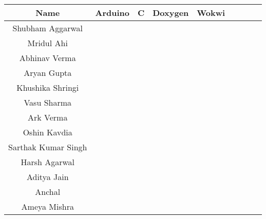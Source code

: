 \begin{center}
\label{table:competency_apd}
\begin{longtable}{|c|c|c|c|c|c|p{1.2cm}|c|c|}
\hline
Name                & Arduino                  & C                        & Doxygen                  & Wokwi                    \\ \hline
Shubham Aggarwal    & \cellcolor[HTML]{92D050} & \cellcolor[HTML]{00B050} & \cellcolor[HTML]{FFC000} & \cellcolor[HTML]{FFFF00} \\ \hline
Mridul Ahi          & \cellcolor[HTML]{92D050} & \cellcolor[HTML]{00B050} & \cellcolor[HTML]{F2F2F2} & \cellcolor[HTML]{F2F2F2} \\ \hline
Abhinav Verma       & \cellcolor[HTML]{92D050} & \cellcolor[HTML]{00B050} & \cellcolor[HTML]{FFC000} & \cellcolor[HTML]{FFC000} \\ \hline
Aryan Gupta         & \cellcolor[HTML]{FFFF00} & \cellcolor[HTML]{FFFF00} & \cellcolor[HTML]{F2F2F2} & \cellcolor[HTML]{F2F2F2} \\ \hline
Khushika Shringi    & \cellcolor[HTML]{92D050} & \cellcolor[HTML]{92D050} & \cellcolor[HTML]{F2F2F2} & \cellcolor[HTML]{FFC000} \\ \hline
Vasu Sharma         & \cellcolor[HTML]{FFFF00} & \cellcolor[HTML]{00B050} & \cellcolor[HTML]{F2F2F2} & \cellcolor[HTML]{FFC000} \\ \hline
Ark Verma           & \cellcolor[HTML]{FFFF00} & \cellcolor[HTML]{00B050} & \cellcolor[HTML]{F2F2F2} & \cellcolor[HTML]{F2F2F2} \\ \hline
Oshin Kavdia        & \cellcolor[HTML]{FFFF00} & \cellcolor[HTML]{00B050} & \cellcolor[HTML]{F2F2F2} & \cellcolor[HTML]{F2F2F2} \\ \hline
Sarthak Kumar Singh & \cellcolor[HTML]{FFFF00} & \cellcolor[HTML]{00B050} & \cellcolor[HTML]{F2F2F2} & \cellcolor[HTML]{F2F2F2} \\ \hline
Harsh Agarwal       & \cellcolor[HTML]{92D050} & \cellcolor[HTML]{92D050} & \cellcolor[HTML]{FFC000} & \cellcolor[HTML]{F2F2F2} \\ \hline
Aditya Jain       & \cellcolor[HTML]{92D050} & \cellcolor[HTML]{92D050} & \cellcolor[HTML]{FFC000} & \cellcolor[HTML]{FFFF00} \\ \hline
Anchal       & \cellcolor[HTML]{92D050} & \cellcolor[HTML]{92D050} & \cellcolor[HTML]{FFFF00} & \cellcolor[HTML]{FFFF00} \\ \hline
Ameya Mishra      & \cellcolor[HTML]{FFFF00} & \cellcolor[HTML]{92D050} & \cellcolor[HTML]{F2F2F2} & \cellcolor[HTML]{F2F2F2} \\ \hline

\end{longtable}
\end{center}
